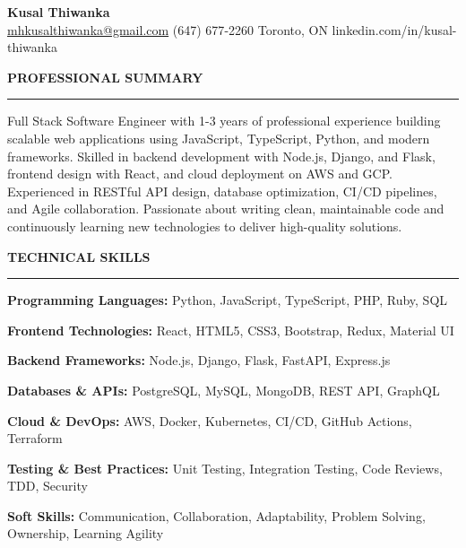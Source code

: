 \documentclass[10pt,letterpaper]{article}
\begin{document}
\begin{center}
{\LARGE\textbf{Kusal Thiwanka}}\\[3pt]
\href{mailto:mhkusalthiwanka@gmail.com}{mhkusalthiwanka@gmail.com}\hspace{2em}%
(647) 677{-}2260\hspace{2em}%
Toronto, ON\hspace{2em}
linkedin.com/in/kusal-thiwanka
\end{center}

\vspace{6pt}

\textbf{PROFESSIONAL SUMMARY}\\[-8pt]
\noindent\rule{\textwidth}{1pt}

\vspace{-2pt}

Full Stack Software Engineer with 1-3 years of professional experience building scalable web applications using JavaScript, TypeScript, Python, and modern frameworks. Skilled in backend development with Node.js, Django, and Flask, frontend design with React, and cloud deployment on AWS and GCP. Experienced in RESTful API design, database optimization, CI/CD pipelines, and Agile collaboration. Passionate about writing clean, maintainable code and continuously learning new technologies to deliver high-quality solutions.

\vspace{8pt}

\textbf{TECHNICAL SKILLS}\\[-8pt]
\noindent\rule{\textwidth}{1pt}

\vspace{-2pt}

\textbf{Programming Languages:} Python, JavaScript, TypeScript, PHP, Ruby, SQL

\textbf{Frontend Technologies:} React, HTML5, CSS3, Bootstrap, Redux, Material UI

\textbf{Backend Frameworks:} Node.js, Django, Flask, FastAPI, Express.js

\textbf{Databases \& APIs:} PostgreSQL, MySQL, MongoDB, REST API, GraphQL

\textbf{Cloud \& DevOps:} AWS, Docker, Kubernetes, CI/CD, GitHub Actions, Terraform

\textbf{Testing \& Best Practices:} Unit Testing, Integration Testing, Code Reviews, TDD, Security

\textbf{Soft Skills:} Communication, Collaboration, Adaptability, Problem Solving, Ownership, Learning Agility
\end{document}
